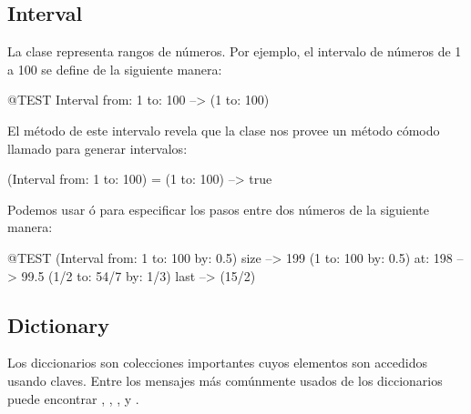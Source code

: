 \documentclass[a4paper,10pt,twoside]{book}
\begin{document}



\subsection{Interval}
La clase  representa rangos de n\'umeros. Por ejemplo, el intervalo de n\'umeros de 1 a 100 se define de la siguiente manera:
\begin{code}{@TEST}
Interval from: 1 to: 100 --> (1 to: 100)
\end{code}

\noindent
El m\'etodo  de este intervalo revela que la clase  nos provee un m\'etodo c\'omodo llamado  para generar intervalos:

\begin{code}{}
(Interval from: 1 to: 100) = (1 to: 100) --> true
\end{code}

Podemos usar  \'o  para especificar los pasos entre dos n\'umeros de la siguiente manera:

\begin{code}{@TEST}
(Interval from: 1 to: 100 by: 0.5) size --> 199
(1 to: 100 by: 0.5) at: 198 --> 99.5
(1/2 to: 54/7 by: 1/3) last --> (15/2)
\end{code}

\subsection{Dictionary}
Los diccionarios son colecciones importantes cuyos elementos son accedidos usando claves. 
Entre los mensajes m\'as com\'unmente usados de los diccionarios puede encontrar , , ,  y .
\end{document}
